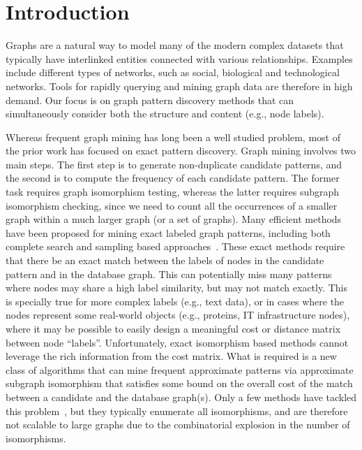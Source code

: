 \section{Introduction}
Graphs are a natural way to model many of the modern complex
datasets that typically have interlinked entities connected with various
relationships. Examples include different types of networks, such as
social, biological and technological networks. Tools for rapidly
querying and mining graph data are therefore in high demand. Our focus
is on graph pattern discovery methods that can simultaneously consider
both the structure and content (e.g., node labels).

Whereas frequent graph mining has long been a well studied problem, most
of the prior work has focused on exact pattern discovery.
Graph mining involves two main steps. The first step is to generate
non-duplicate candidate patterns, and the second is to compute the
frequency of each candidate pattern. The former task requires graph
isomorphism testing, whereas the latter requires subgraph isomorphism
checking, since we need to count all the occurrences of a smaller graph
within a much larger graph (or a set of graphs). Many efficient methods
have been proposed for mining exact labeled graph patterns, including
both complete search and sampling based
approaches~\cite{gSpan,HWP03,kuramochi2005ffp,FSG01,IWM03,2009-graphsampling}.
These exact methods require that there be an exact match between the
labels of nodes in the candidate pattern and in the database graph. This
can potentially miss many patterns where nodes may share a high label
similarity, but may not match exactly. This is specially true for more
complex labels (e.g., text data), or in cases where the nodes represent
some real-world objects (e.g., proteins, IT infrastructure nodes), where
it may be possible to easily design a meaningful cost or distance matrix  between node ``labels''. Unfortunately, exact isomorphism
based methods cannot leverage the rich information from the cost matrix.
What is required is a new class of algorithms that can mine
frequent approximate patterns via approximate subgraph isomorphism that
satisfies some bound on the overall cost of the match between a candidate
and the database graph(s). Only a few methods have tackled this
problem~\cite{gapprox,JiaZH11,RAM2008}, but they typically enumerate all
isomorphisms, and are therefore not scalable to large graphs due to the
combinatorial explosion in the number of isomorphisms.

